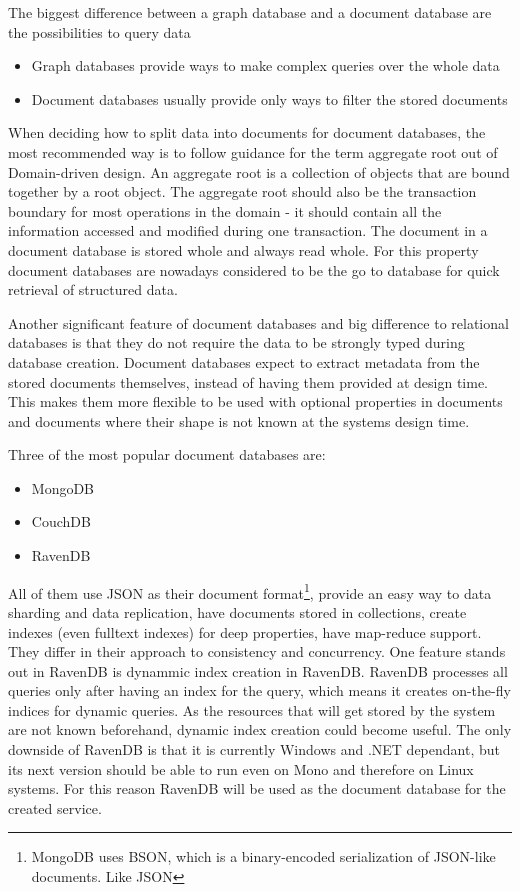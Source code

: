 The biggest difference between a graph database and a document database are the possibilities to query data 
\begin{itemize}
	\item Graph databases provide ways to make complex queries over the whole data
	\item Document databases usually provide only ways to filter the stored documents
\end{itemize}
When deciding how to split data into documents for document databases, the most recommended way is to follow guidance for the term aggregate root out of Domain-driven design\cite{onlineDomainDrivenDesign}. An aggregate root is a collection of objects that are bound together by a root object. The aggregate root should also be the transaction boundary for most operations in the domain - it should contain all the information accessed and modified during one transaction. The document in a document database is stored whole and always read whole. For this property document databases are nowadays considered to be the go to database for quick retrieval of structured data.

Another significant feature of document databases and big difference to relational databases is that they do not require the data to be strongly typed during database creation. Document databases expect to extract metadata from the stored documents themselves, instead of having them provided at design time. This makes them more flexible to be used with optional properties in documents and documents where their shape is not known at the systems design time. 

Three of the most popular document databases are\cite{onlineDocumentDBRanking}:
\begin{itemize}
	\item MongoDB\cite{onlineMongoDB}
	\item CouchDB\cite{onlineCouchDB}
	\item RavenDB\cite{onlineRavenDB}
\end{itemize}
All of them use JSON as their document format\footnote{MongoDB uses BSON, which is a binary-encoded serialization of JSON-like documents. Like JSON}, provide an easy way to data sharding and data replication, have documents stored in collections, create indexes (even fulltext indexes) for deep properties, have map-reduce support. They differ in their approach to consistency and concurrency. One feature stands out in RavenDB is dynammic index creation in RavenDB. RavenDB processes all queries only after having an index for the query, which means it creates on-the-fly indices for dynamic queries. As the resources that will get stored by the system are not known beforehand, dynamic index creation could become useful. The only downside of RavenDB is that it is currently Windows and .NET dependant, but its next version should be able to run even on Mono and therefore on Linux systems\cite{onlineRavenDBonLinux}.
For this reason RavenDB will be used as the document database for the created service.

